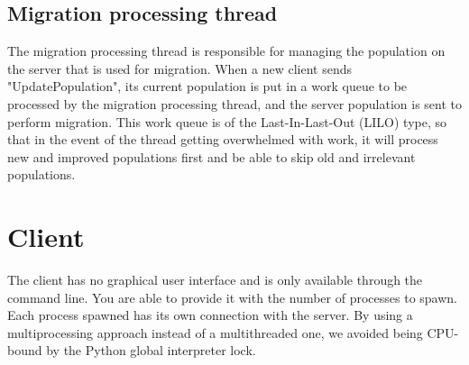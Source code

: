 \subsection{Migration processing thread}
The migration processing thread is responsible for managing the population on the server that is used for migration. When a new client sends "UpdatePopulation", its current population is put in a work queue to be processed by the migration processing thread, and the server population is sent to perform migration. This work queue is of the Last-In-Last-Out (LILO) type, so that in the event of the thread getting overwhelmed with work, it will process new and improved populations first and be able to skip old and irrelevant populations.
\newpage
\section{Client}
The client has no graphical user interface and is only available through the command line. You are able to provide it with the number of processes to spawn. Each process spawned has its own connection with the server. By using a multiprocessing approach instead of a multithreaded one, we avoided being CPU-bound by the Python global interpreter lock.
